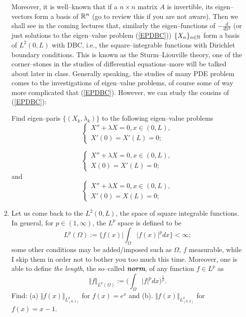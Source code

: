 \documentclass[6pt]{article}
\numberwithin{equation}{section}
\def\mathbb{\Bbb}
\begin{document}
\begin{enumerate}
Moreover, it is well--known that if a $n\times n$ matrix $A$ is invertible, its eigen--vectors form a basis of $\mathbb R^n$ (go to review this if you are not aware).  Then we shall see in the coming lectures that, similarly the eigen--functions of $-\frac{d}{dx^2}$ (or just solutions to the eigen--value problem (\ref{EPDBC})) $\{X_n\}_{n\in\mathbb N}$ form a basis of $L^2(0,L)$ with DBC, i.e., the square--integrable functions with Dirichlet boundary conditions.  This is known as the Sturm–Liouville theory, one of the corner--stones in the studies of differential equations--more will be talked about later in class.  Generally speaking, the studies of many PDE problem comes to the investigations of eigen--value problems, of course some of way more complicated that (\ref{EPDBC}).  However, we can study the cousins of (\ref{EPDBC}):

Find eigen--paris $\{(X_k, \lambda_k)\}$ to the following eigen--value problems
\begin{equation}
\left\{
\begin{array}{ll}
X''+\lambda X=0, x\in (0,L),\\
X'(0)=X'(L)=0;
\end{array}
\right.
\end{equation}

\begin{equation}
\left\{
\begin{array}{ll}
X''+\lambda X=0, x\in (0,L),\\
X(0)=X'(L)=0;
\end{array}
\right.
\end{equation}
and
\begin{equation}
\left\{
\begin{array}{ll}
X''+\lambda X=0, x\in (0,L),\\
X'(0)=X(L)=0;
\end{array}
\right.
\end{equation}


\item Let us come back to the $L^2(0,L)$, the space of square integrable functions.  In general, for $p\in(1,\infty)$, the $L^p$ space is defined to be
\[L^p(\Omega):=\Big\{f(x)\Big|\int_\Omega |f(x)|^pdx\Big\}<\infty;\]
some other conditions may be added/imposed such as $\Omega$, $f$ measurable, while I skip them in order not to bother you too much this time.
Moreover, one is able to define \emph{the length}, the so--called \textbf{\emph{norm}}, of any function $f\in L^p$ as
\[\Vert f\Vert_{L^p(\Omega)}:=\Big(\int_\Omega \vert f \vert^p dx\Big)^\frac{1}{p}.\]
Find: (a) $\Vert f(x) \Vert_{L^2_{(0,1)}}$ for $f(x)=e^x$ and  (b). $\Vert f(x) \Vert_{L^2_{(0,2)}}$ for $f(x)=x-1$.


\end{enumerate}
\end{document}
